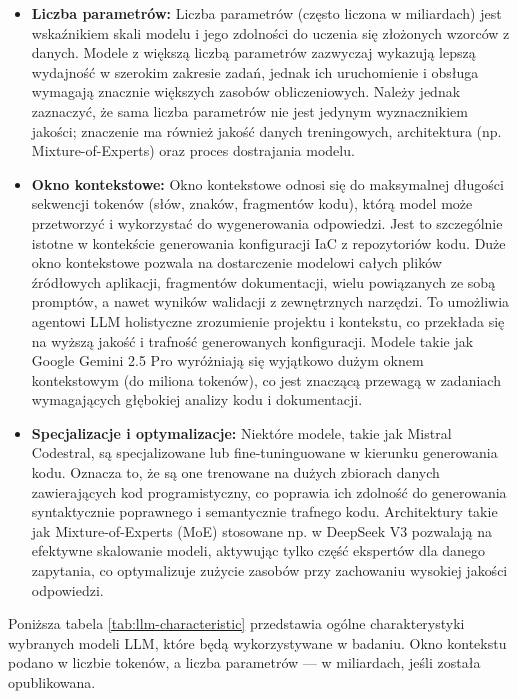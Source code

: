 \begin{itemize}
    \item \textbf{Liczba parametrów:} Liczba parametrów (często liczona w miliardach) jest wskaźnikiem skali modelu i jego zdolności do uczenia się złożonych wzorców z danych. Modele z większą liczbą parametrów zazwyczaj wykazują lepszą wydajność w szerokim zakresie zadań, jednak ich uruchomienie i obsługa wymagają znacznie większych zasobów obliczeniowych. Należy jednak zaznaczyć, że sama liczba parametrów nie jest jedynym wyznacznikiem jakości; znaczenie ma również jakość danych treningowych, architektura (np. Mixture-of-Experts) oraz proces dostrajania modelu.
    \item \textbf{Okno kontekstowe:} Okno kontekstowe odnosi się do maksymalnej długości sekwencji tokenów (słów, znaków, fragmentów kodu), którą model może przetworzyć i wykorzystać do wygenerowania odpowiedzi. Jest to szczególnie istotne w kontekście generowania konfiguracji IaC z repozytoriów kodu. Duże okno kontekstowe pozwala na dostarczenie modelowi całych plików źródłowych aplikacji, fragmentów dokumentacji, wielu powiązanych ze sobą promptów, a nawet wyników walidacji z zewnętrznych narzędzi. To umożliwia agentowi LLM holistyczne zrozumienie projektu i kontekstu, co przekłada się na wyższą jakość i trafność generowanych konfiguracji. Modele takie jak Google Gemini 2.5 Pro wyróżniają się wyjątkowo dużym oknem kontekstowym (do miliona tokenów), co jest znaczącą przewagą w zadaniach wymagających głębokiej analizy kodu i dokumentacji.
    \item \textbf{Specjalizacje i optymalizacje:} Niektóre modele, takie jak Mistral Codestral, są specjalizowane lub fine-tuninguowane w kierunku generowania kodu. Oznacza to, że są one trenowane na dużych zbiorach danych zawierających kod programistyczny, co poprawia ich zdolność do generowania syntaktycznie poprawnego i semantycznie trafnego kodu. Architektury takie jak Mixture-of-Experts (MoE) stosowane np. w DeepSeek V3 pozwalają na efektywne skalowanie modeli, aktywując tylko część ekspertów dla danego zapytania, co optymalizuje zużycie zasobów przy zachowaniu wysokiej jakości odpowiedzi.
\end{itemize}

Poniższa tabela \ref{tab:llm-characteristic} przedstawia ogólne charakterystyki wybranych modeli LLM, które będą wykorzystywane w badaniu. Okno kontekstu podano w liczbie tokenów, a liczba parametrów — w miliardach, jeśli została opublikowana.

\newpage


